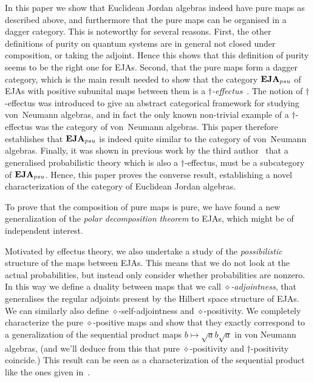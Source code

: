 \documentclass[submission,copyright,creativecommons]{eptcs}
\newcounter{main}
\theoremstyle{definition}
\newcommand{\EJA}{\text{\textbf{EJA}}\xspace}
\begin{document}
In this paper we show that Euclidean Jordan algebras indeed
have pure maps as described above, and furthermore that the
pure maps can be organised in a dagger category. This is
noteworthy for several reasons.
First, the other definitions of purity on
quantum systems are in general not closed under composition,
or taking the adjoint. Hence this shows that this definition
of purity seems to be the right one for EJAs.
Second, that the pure maps form a dagger category, which is the main result
needed to show that the category $\EJA_{psu}$ of EJAs with positive subunital
maps between them is a \emph{$\dagger$-effectus}~\cite{basthesis}.
The notion of $\dagger$-effectus was introduced to give an abstract
categorical framework for studying von~Neumann algebras, and in fact
the only known non-trivial example of a $\dagger$-effectus was
the category of von~Neumann algebras. This paper therefore 
establishes that $\EJA_{psu}$ is indeed quite similar to 
the category of von~Neumann algebras.
Finally, it was shown in previous work by the third 
author~\cite{wetering2018reconstruction} that a
generalised probabilistic theory which is also a $\dagger$-effectus,
must be a subcategory of $\EJA_{psu}$. Hence, 
this paper proves the converse result, establishing a 
novel characterization of the category of Euclidean Jordan algebras.

To prove that the composition of pure maps is pure,
    we have found a new generalization
    of the \emph{polar decomposition theorem} to EJAs,
    which  might be of independent interest.

Motivated by effectus theory, we also undertake a study of the
\emph{possibilistic} structure of the maps between EJAs.
This means that we do not look at the actual probabilities, but
instead only consider whether probabilities are nonzero.
In this way we define a duality between maps that we call
\emph{$\diamond$-adjointness}, that generalises
the regular adjoints present by the Hilbert space structure of EJAs. 
We can similarly also define $\diamond$-self-adjointness and $\diamond$-positivity. 
We completely characterize the pure $\diamond$-positive maps and show that they exactly correspond to a generalization 
of the sequential product maps $b\mapsto \sqrt{a}b\sqrt{a}$ in von Neumann algebras, (and we'll deduce from this 
that pure $\diamond$-positivity and $\dagger$-positivity coincide.)
This result can be seen as a characterization of the sequential product like the ones given in~\cite{gudder2008characterization,wetering2018characterisation,westerbaan2016universal}.
\end{document}
